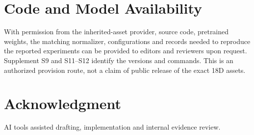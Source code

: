 \documentclass[conference]{IEEEtran}
\begin{document}
\section{Code and Model Availability}

With permission from the inherited-asset provider, source code, pretrained weights, the matching normalizer, configurations and records needed to reproduce the reported experiments can be provided to editors and reviewers upon request. Supplement S9 and S11--S12 identify the versions and commands. This is an authorized provision route, not a claim of public release of the exact 18D assets.

\section*{Acknowledgment}

AI tools assisted drafting, implementation and internal evidence review.
\end{document}
